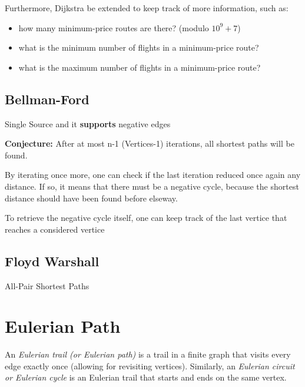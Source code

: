 		Furthermore, Dijkstra be extended to keep track of more information, such as:

		\begin{itemize}
			\item how many minimum-price routes are there? (modulo $10^9+7$)
			\item what is the minimum number of flights in a minimum-price route?
			\item what is the maximum number of flights in a minimum-price route?
		\end{itemize}


	\subsection{Bellman-Ford}

		Single Source and it \textbf{supports} negative edges

		\textbf{Conjecture:} After at most n-1 (Vertices-1) iterations, all shortest paths will be found.
		

		By iterating once more, one can check if the last iteration reduced once again any distance. If so, it means that
		there must be a negative cycle, because the shortest distance should have been found before elseway.
		
		To retrieve the negative cycle itself, one can keep track of the last vertice that reaches a considered vertice

	
	\vspace{7pts}

	\subsection{Floyd Warshall}

	All-Pair Shortest Paths


\section{Eulerian Path}

	An \textit{Eulerian trail (or Eulerian path)} is a trail in a finite graph that visits every edge exactly once 
	(allowing for revisiting vertices). Similarly, an \textit{Eulerian circuit or Eulerian cycle} is an Eulerian trail 
	that starts and ends on the same vertex. 

